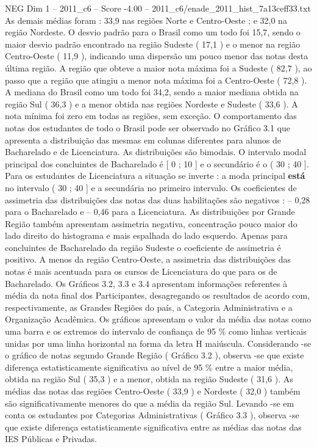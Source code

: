 \begin{textsample}{NEG Dim 1 – 2011\_c6 – Score -4.00 – 2011\_c6/enade\_2011\_hist\_7a13ceff33.txt}
As demais médias foram : 33,9 nas regiões Norte e Centro-Oeste ; e 32,0 na região Nordeste.
O desvio padrão para o Brasil como um todo foi 15,7, sendo o maior desvio padrão encontrado na região Sudeste ( 17,1 ) e o menor na região Centro-Oeste ( 11,9 ), indicando uma dispersão um pouco menor das notas desta última região.
A região que obteve a maior nota máxima foi a Sudeste ( 82,7 ), ao passo que a região que atingiu a menor nota máxima foi a Centro-Oeste ( 72,8 ).
A mediana do Brasil como um todo foi 34,2, sendo a maior mediana obtida na região Sul ( 36,3 ) e a menor obtida nas regiões Nordeste e Sudeste ( 33,6 ).
A nota mínima foi zero em todas as regiões, sem exceção.
O comportamento das notas dos estudantes de todo o Brasil pode ser observado no Gráfico 3.1 que apresenta a distribuição das mesmas em colunas diferentes para alunos de Bacharelado e de Licenciatura.
As distribuições são bimodais.
O intervalo modal principal dos concluintes de Bacharelado é [ 0 ; 10 ] e o secundário é o ( 30 ; 40 ].
Para os estudantes de Licenciatura a situação se inverte : a moda principal \textbf{está} no intervalo ( 30 ; 40 ] e a secundária no primeiro intervalo.
Os coeficientes de assimetria das distribuições das notas das duas habilitações são negativos : – 0,28 para o Bacharelado e – 0,46 para a Licenciatura.
As distribuições por Grande Região também apresentam assimetria negativa, concentração pouco maior do lado direito do histograma e mais espalhada do lado esquerdo.
Apenas para concluintes de Bacharelado da região Sudeste o coeficiente de assimetria é positivo.
A menos da região Centro-Oeste, a assimetria das distribuições das notas é mais acentuada para os cursos de Licenciatura do que para os de Bacharelado.
Os Gráficos 3.2, 3.3 e 3.4 apresentam informações referentes à média da nota final dos Participantes, desagregando os resultados de acordo com, respectivamente, as Grandes Regiões do país, a Categoria Administrativa e a Organização Acadêmica.
Os gráficos apresentam o valor da média das notas como uma barra e os extremos do intervalo de confiança de 95 \% como linhas verticais unidas por uma linha horizontal na forma da letra H maiúscula.
Considerando -se o gráfico de notas segundo Grande Região ( Gráfico 3.2 ), observa -se que existe diferença estatisticamente significativa ao nível de 95 \% entre a maior média, obtida na região Sul ( 35,3 ) e a menor, obtida na região Sudeste ( 31,6 ).
As médias das notas das regiões Centro-Oeste ( 33,9 ) e Nordeste ( 32,0 ) também são significativamente menores do que a média da região Sul.
Levando -se em conta os estudantes por Categorias Administrativas ( Gráfico 3.3 ), observa -se que existe diferença estatisticamente significativa entre as médias das notas das IES Públicas e Privadas.

\end{textsample}
